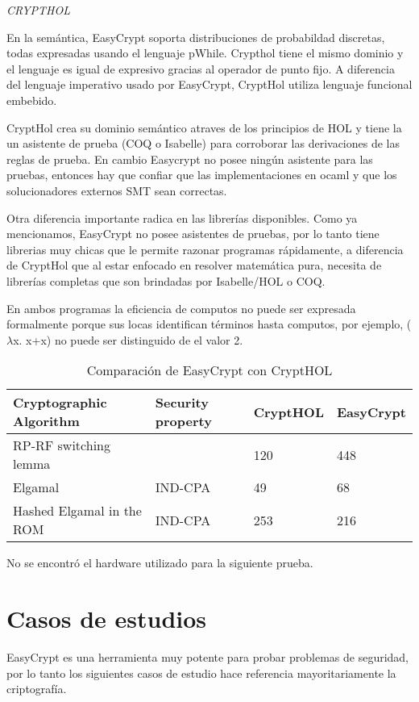 \documentclass[runningheads,a4paper]{llncs}
\begin{document}
\centerline{\emph{CRYPTHOL}}

En la semántica, EasyCrypt soporta distribuciones de probabildad discretas, todas expresadas usando el lenguaje pWhile. Crypthol tiene el mismo dominio y el lenguaje es igual de expresivo gracias al operador de punto fijo. A diferencia del lenguaje imperativo usado por EasyCrypt, CryptHol utiliza lenguaje funcional embebido.

CryptHol crea su dominio semántico atraves de los principios de HOL y tiene la un asistente de prueba (COQ o Isabelle) para corroborar las derivaciones de las reglas de prueba. En cambio Easycrypt no posee ningún asistente para las pruebas, entonces hay que confiar que las implementaciones en ocaml y que los solucionadores externos SMT sean correctas.

Otra diferencia importante radica en las librerías disponibles. Como ya mencionamos, EasyCrypt no posee asistentes de pruebas, por lo tanto tiene librerias muy chicas que le permite razonar programas rápidamente, a diferencia de CryptHol que al estar enfocado en resolver matemática pura, necesita de librerías completas que son brindadas por Isabelle/HOL o COQ.

En ambos programas la eficiencia de computos no puede ser expresada formalmente porque sus locas identifican términos hasta computos, por ejemplo, ($\lambda$x. x+x) no puede ser distinguido de el valor 2.\cite{article6}

\begin{table}
  \caption{Comparación de EasyCrypt con CryptHOL}
  \label{tab:simple2}
  \centering
  \begin{tabular}{ |p{4cm}|p{1.5cm}|p{1.5cm}|p{1.5cm}|  }
 \hline
 Cryptographic Algorithm & Security property & CryptHOL & EasyCrypt\\\cline{1-4}
 \hline
 RP-RF switching lemma &  & 120 & 448\\
 Elgamal & IND-CPA & 49  & 68\\
 Hashed Elgamal in the ROM & IND-CPA & 253 &  216\\
 \hline
\end{tabular}
\end{table}


No se encontró el hardware utilizado para la siguiente prueba.




\section{Casos de estudios}
EasyCrypt es una herramienta muy potente para probar problemas de seguridad, por lo tanto los siguientes casos de estudio hace referencia mayoritariamente la criptografía.
\end{document}

